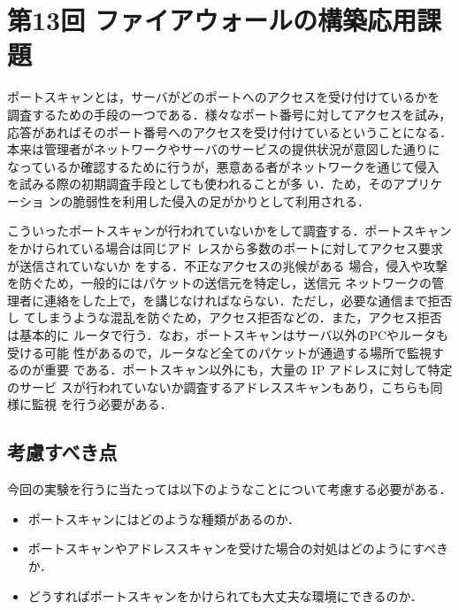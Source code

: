\section{第13回 ファイアウォールの構築応用課題}

ポートスキャンとは，サーバがどのポートへのアクセスを受け付けているかを
調査するための手段の一つである．様々なポート番号に対してアクセスを試み，
応答があればそのポート番号へのアクセスを受け付けているということになる．
本来は管理者がネットワークやサーバのサービスの提供状況が意図した通りに
なっているか確認するために行うが，悪意ある者がネットワークを通じて侵入
を試みる際の初期調査手段としても使われることが多
い．\textbf{}ため，そのアプリケーショ
ンの脆弱性を利用した侵入の足がかりとして利用される．

こういったポートスキャンが行われていないかを\textbf{}して調査する．ポートスキャンをかけられている場合は同じアド
レスから多数のポートに対してアクセス要求が送信されていないか
を\textbf{}する．不正なアクセスの兆候がある
場合，侵入や攻撃を防ぐため，一般的にはパケットの送信元を特定し，送信元
ネットワークの管理者に連絡をした上で，\textbf{}を講じなければならない．ただし，必要な通信まで拒否し
てしまうような混乱を防ぐため，アクセス拒否などの\textbf{}．また，アクセス拒否は基本的に
ルータで行う．なお，ポートスキャンはサーバ以外のPCやルータも受ける可能
性があるので，ルータなど全てのパケットが通過する場所で監視するのが重要
である．ポートスキャン以外にも，大量の IP アドレスに対して特定のサービ
スが行われていないか調査するアドレススキャンもあり，こちらも同様に監視
を行う必要がある．

\subsection*{考慮すべき点}
今回の実験を行うに当たっては以下のようなことについて考慮する必要がある．
\begin{itemize}
  \item ポートスキャンにはどのような種類があるのか．
  \item ポートスキャンやアドレススキャンを受けた場合の対処はどのようにすべきか．
  \item どうすればポートスキャンをかけられても大丈夫な環境にできるのか．      
\end{itemize}
